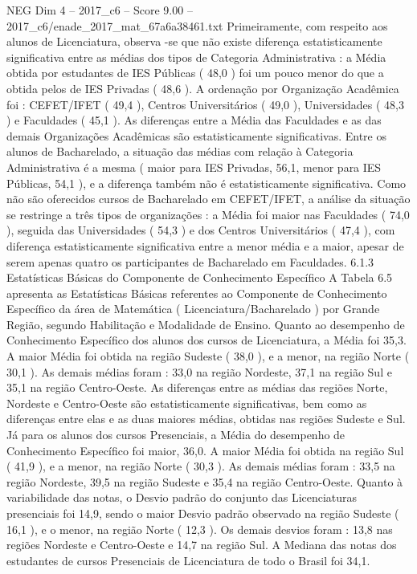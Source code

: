 \begin{textsample}{NEG Dim 4 – 2017\_c6 – Score 9.00 – 2017\_c6/enade\_2017\_mat\_67a6a38461.txt}
Primeiramente, com respeito aos alunos de Licenciatura, observa -se que não existe diferença estatisticamente significativa entre as médias dos tipos de Categoria Administrativa : a Média obtida por estudantes de IES Públicas ( 48,0 ) foi um pouco menor do que a obtida pelos de IES Privadas ( 48,6 ).
A ordenação por Organização Acadêmica foi : CEFET/IFET ( 49,4 ), Centros Universitários ( 49,0 ), Universidades ( 48,3 ) e Faculdades ( 45,1 ).
As diferenças entre a Média das Faculdades e as das demais Organizações Acadêmicas são estatisticamente significativas.
Entre os alunos de Bacharelado, a situação das médias com relação à Categoria Administrativa é a mesma ( maior para IES Privadas, 56,1, menor para IES Públicas, 54,1 ), e a diferença também não é estatisticamente significativa.
Como não são oferecidos cursos de Bacharelado em CEFET/IFET, a análise da situação se restringe a três tipos de organizações : a Média foi maior nas Faculdades ( 74,0 ), seguida das Universidades ( 54,3 ) e dos Centros Universitários ( 47,4 ), com diferença estatisticamente significativa entre a menor média e a maior, apesar de serem apenas quatro os participantes de Bacharelado em Faculdades. 6.1.3 Estatísticas Básicas do Componente de Conhecimento Específico A Tabela 6.5 apresenta as Estatísticas Básicas referentes ao Componente de Conhecimento Específico da área de Matemática ( Licenciatura/Bacharelado ) por Grande Região, segundo Habilitação e Modalidade de Ensino.
Quanto ao desempenho de Conhecimento Específico dos alunos dos cursos de Licenciatura, a Média foi 35,3.
A maior Média foi obtida na região Sudeste ( 38,0 ), e a menor, na região Norte ( 30,1 ).
As demais médias foram : 33,0 na região Nordeste, 37,1 na região Sul e 35,1 na região Centro-Oeste.
As diferenças entre as médias das regiões Norte, Nordeste e Centro-Oeste são estatisticamente significativas, bem como as diferenças entre elas e as duas maiores médias, obtidas nas regiões Sudeste e Sul.
Já para os alunos dos cursos Presenciais, a Média do desempenho de Conhecimento Específico foi maior, 36,0.
A maior Média foi obtida na região Sul ( 41,9 ), e a menor, na região Norte ( 30,3 ).
As demais médias foram : 33,5 na região Nordeste, 39,5 na região Sudeste e 35,4 na região Centro-Oeste.
Quanto à variabilidade das notas, o Desvio padrão do conjunto das Licenciaturas presenciais foi 14,9, sendo o maior Desvio padrão observado na região Sudeste ( 16,1 ), e o menor, na região Norte ( 12,3 ).
Os demais desvios foram : 13,8 nas regiões Nordeste e Centro-Oeste e 14,7 na região Sul.
A Mediana das notas dos estudantes de cursos Presenciais de Licenciatura de todo o Brasil foi 34,1.

\end{textsample}
